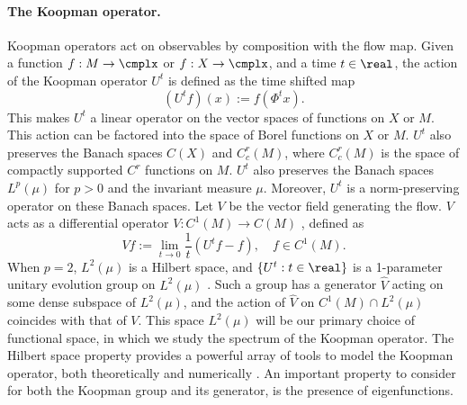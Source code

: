 \documentclass[12pt,oneside]{article}
\begin{document}
\paragraph{The Koopman operator.} Koopman operators \cite{Nadkarni} act on observables by composition with the flow map. Given a function $f:M\to \cmplx$ or $f:X\to\cmplx$, and a time $t\in\real$, the action of the Koopman operator $U^t$ is defined as the time shifted map
%
\begin{equation}\label{eqn:def_Koop}
(U^t f)(x) := f\left( \Phi^t x \right).
\end{equation}
%
This makes $U^t$ a linear operator on the vector spaces of functions on $X$ or $M$. This action can be factored into the space of Borel functions on $X$ or $M$. $U^t$ also preserves the Banach spaces $C(X)$ and $C^r_c(M)$, where $C^r_c(M)$ is the space of compactly supported $C^r$ functions on $M$. $U^t$ also preserves the Banach spaces $L^p(\mu)$ for $p>0$ and the invariant measure $\mu$. Moreover, $U^t$ is a norm-preserving operator on these Banach spaces. Let $V$ be the vector field generating the flow. $V$ acts as a differential operator $V:C^1(M) \to C(M)$ , defined as
%
\begin{equation*}\label{eqn:def_gen_flow}
V f:=\lim_{t\to 0} \frac{ 1 }{ t } \left(U^t f - f\right), \quad f \in C^1(M).
\end{equation*}
%
When $p=2$, $L^2(\mu)$ is a Hilbert space, and $\{ U^t : t\in\real \}$ is a 1-parameter unitary evolution group on $L^2(\mu)$ \cite{DasGiannakis_delay_2019, DGJ_compactV_2018}. Such a group has a generator $\hat{V}$ acting on some dense subspace of $L^2(\mu)$, and the action of $\hat{V}$ on $C^1(M)\cap L^2(\mu)$ coincides with that of $V$. This space $L^2(\mu)$ will be our primary choice of functional space, in which we study the spectrum of the Koopman operator. The Hilbert space property provides a powerful array of tools to model the Koopman operator, both theoretically and numerically \cite[e.g.]{FroylandEtAl14, FroylandEtAl_coherent_2010, DasGiannakis_delay_2019, DGJ_compactV_2018, Philipp2024error}. An important property to consider for both the Koopman group and its generator, is the presence of eigenfunctions.
\end{document}
